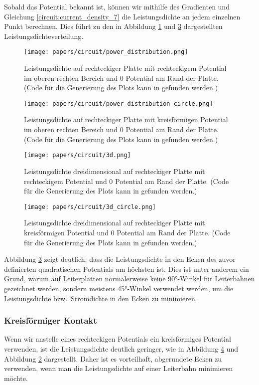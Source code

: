 Sobald das Potential bekannt ist, können wir mithilfe des Gradienten und Gleichung \eqref{circuit:current_density_7} die Leistungsdichte an jedem einzelnen Punkt berechnen. Dies führt zu den in Abbildung \ref{fig:power_2d} und \ref{fig:power_3d_rectangle} dargestellten Leistungsdichteverteilung.
\begin{figure}[h]
	\centering
	\texttt{[image: papers/circuit/power\_distribution.png]}
	\caption{Leistungsdichte auf rechteckiger Platte mit rechteckigem Potential im oberen rechten Bereich und 0 Potential am Rand der Platte. (Code für die Generierung des Plots kann in \cite{github:AndreasFMueller} gefunden werden.)}
	\label{fig:power_2d}
\end{figure}%
\begin{figure}[h]
	\centering
	\texttt{[image: papers/circuit/power\_distribution\_circle.png]}
	\caption{Leistungsdichte auf rechteckiger Platte mit kreisförmigen Potential im oberen rechten Bereich und 0 Potential am Rand der Platte. (Code für die Generierung des Plots kann in \cite{github:AndreasFMueller} gefunden werden.)}
	\label{fig:power_2d_circle}
\end{figure}%
\begin{figure}[h]
	\centering
	\texttt{[image: papers/circuit/3d.png]}
	\caption{Leistungsdichte dreidimensional auf rechteckiger Platte mit rechteckigem Potential und 0 Potential am Rand der Platte. (Code für die Generierung des Plots kann in \cite{github:AndreasFMueller} gefunden werden.)}
	\label{fig:power_3d_rectangle}
\end{figure}%
\begin{figure}[h]
	\centering
	\texttt{[image: papers/circuit/3d\_circle.png]}
	\caption{Leistungsdichte dreidimensional auf rechteckiger Platte mit kreisförmigen Potential und 0 Potential am Rand der Platte. (Code für die Generierung des Plots kann in \cite{github:AndreasFMueller} gefunden werden.)}
	\label{fig:power_3d_circle}
\end{figure}%
Abbildung \ref{fig:power_3d_rectangle} zeigt deutlich, dass die
Leistungsdichte in den Ecken des zuvor definierten quadratischen
Potentials am höchsten ist. Dies ist unter anderem ein Grund, warum
auf Leiterplatten normalerweise keine 90°-Winkel für Leiterbahnen
gezeichnet werden, sondern meistens 45°-Winkel verwendet werden,
um die Leistungsdichte bzw.~Stromdichte in den Ecken zu minimieren.
%

\subsubsection{Kreisförmiger Kontakt}
Wenn wir anstelle eines rechteckigen Potentials ein kreisförmiges Potential verwenden, ist die Leistungsdichte deutlich geringer, wie in Abbildung \ref{fig:power_3d_circle} und Abbildung \ref{fig:power_2d_circle} dargestellt. Daher ist es vorteilhaft, abgerundete Ecken zu verwenden, wenn man die Leistungsdichte auf einer Leiterbahn minimieren möchte.

